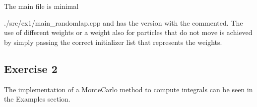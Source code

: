 The main file is minimal
%
\lstset{basicstyle=\scriptsize\sf}

    {./src/ex1/main_randomlap.cpp}
\lstset{basicstyle=\sf}
%
and has the version with the  commented. The use of
different weights or a weight also for particles that do not move is achieved by
simply passing the correct initializer list that represents the weights.

\subsection*{Exercise 2}

The implementation of a MonteCarlo method to compute integrals can be seen in
the Examples section.

